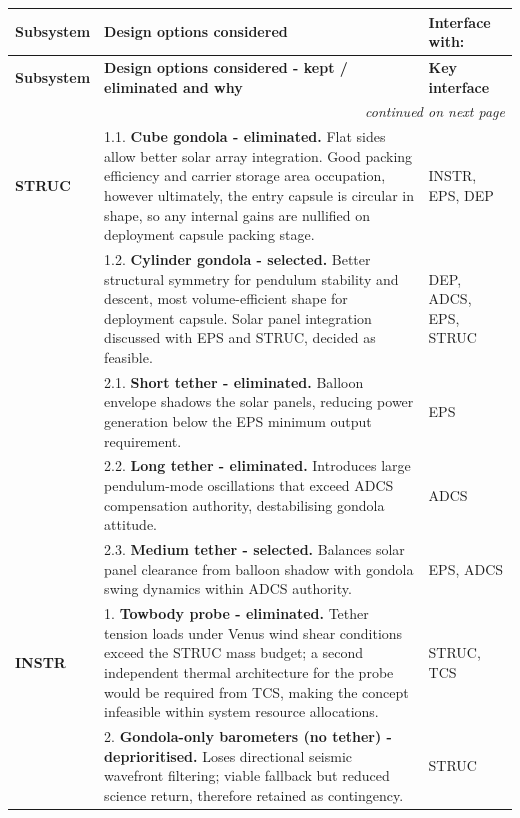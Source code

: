 {\footnotesize
\renewcommand{\arraystretch}{1}
\begin{longtable}{@{} p{1.8cm} p{11cm} p{2.5cm} @{}}
\label{tab:tradeoffinterfaces}

\textbf{Subsystem} & \textbf{Design options considered} & \textbf{Interface with:} \\
\midrule
\endfirsthead
\toprule
\textbf{Subsystem} & \textbf{Design options considered - kept / eliminated and why} & \textbf{Key interface} \\
\midrule
\endhead
\midrule
\multicolumn{3}{r}{\small\textit{continued on next page}} \\
\endfoot
\bottomrule
\endlastfoot

\textbf{STRUC} &
1.1. \textbf{Cube gondola - eliminated.} Flat sides allow better solar array integration. Good packing efficiency and carrier storage area occupation, however ultimately, the entry capsule is circular in shape, so any internal gains are nullified on deployment capsule packing stage.
& INSTR, EPS, DEP \\[6pt]

&
1.2. \textbf{Cylinder gondola - selected.} Better structural symmetry for pendulum stability and descent, most volume-efficient shape for deployment capsule. Solar panel integration discussed with EPS and STRUC, decided as feasible.
& DEP, ADCS, EPS, STRUC \\[6pt]

&
2.1. \textbf{Short tether - eliminated.} Balloon envelope shadows the solar panels, reducing power generation below the EPS minimum output requirement.
& EPS \\[6pt]

&
2.2. \textbf{Long tether - eliminated.} Introduces large pendulum-mode oscillations that exceed ADCS compensation authority, destabilising gondola attitude.
& ADCS \\[6pt]

&
2.3. \textbf{Medium tether - selected.} Balances solar panel clearance from balloon shadow with gondola swing dynamics within ADCS authority.
& EPS, ADCS \\[6pt]
\midrule
\textbf{INSTR} &
1. \textbf{Towbody probe - eliminated.} Tether tension loads under Venus wind shear conditions exceed the STRUC mass budget; a second independent thermal architecture for the probe would be required from TCS, making the concept infeasible within system resource allocations.
& STRUC, TCS \\[6pt]

&
2. \textbf{Gondola-only barometers (no tether) - deprioritised.} Loses directional seismic wavefront filtering; viable fallback but reduced science return, therefore retained as contingency.
& STRUC \\[6pt]


\end{longtable}}
